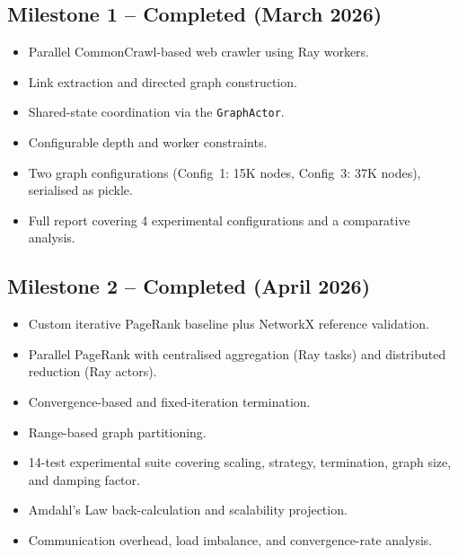 \documentclass[11pt,a4paper]{article}
\begin{document}
\subsection{Milestone 1 -- Completed (March 2026)}
\begin{itemize}
    \item[\checkmark] Parallel CommonCrawl-based web crawler using Ray
    workers.
    \item[\checkmark] Link extraction and directed graph construction.
    \item[\checkmark] Shared-state coordination via the
    \texttt{GraphActor}.
    \item[\checkmark] Configurable depth and worker constraints.
    \item[\checkmark] Two graph configurations (Config~1: 15K nodes,
    Config~3: 37K nodes), serialised as pickle.
    \item[\checkmark] Full report covering 4 experimental
    configurations and a comparative analysis.
\end{itemize}

\subsection{Milestone 2 -- Completed (April 2026)}
\begin{itemize}
    \item[\checkmark] Custom iterative PageRank baseline plus NetworkX
    reference validation.
    \item[\checkmark] Parallel PageRank with centralised aggregation
    (Ray tasks) and distributed reduction (Ray actors).
    \item[\checkmark] Convergence-based and fixed-iteration termination.
    \item[\checkmark] Range-based graph partitioning.
    \item[\checkmark] 14-test experimental suite covering scaling,
    strategy, termination, graph size, and damping factor.
    \item[\checkmark] Amdahl's Law back-calculation and scalability
    projection.
    \item[\checkmark] Communication overhead, load imbalance, and
    convergence-rate analysis.
\end{itemize}
\end{document}
